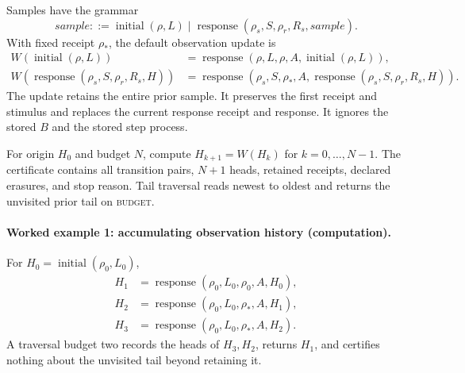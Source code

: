 Samples have the grammar
\[
 \textit{sample}::=\operatorname{initial}(\rho,L)
 \mid\operatorname{response}(\rho_s,S,\rho_r,R_s,\textit{sample}).
\]
With fixed receipt \(\rho_*\), the default observation update is
\[
\begin{aligned}
 W(\operatorname{initial}(\rho,L))
   &=\operatorname{response}(\rho,L,\rho,A,\operatorname{initial}(\rho,L)),\\
 W(\operatorname{response}(\rho_s,S,\rho_r,R_s,H))
   &=\operatorname{response}(\rho_s,S,\rho_*,A,
      \operatorname{response}(\rho_s,S,\rho_r,R_s,H)).
\end{aligned}
\]
The update retains the entire prior sample.  It preserves the first receipt and stimulus and replaces the current
response receipt and response.  It ignores the stored \(B\) and the stored step process.

For origin \(H_0\) and budget \(N\), compute \(H_{k+1}=W(H_k)\) for \(k=0,\ldots,N-1\).  The certificate contains all
transition pairs, \(N+1\) heads, retained receipts, declared erasures, and stop reason.  Tail traversal reads newest to
oldest and returns the unvisited prior tail on \textsc{budget}.

\paragraph{Worked example 1: accumulating observation history (computation).}
For \(H_0=\operatorname{initial}(\rho_0,L_0)\),
\[
\begin{aligned}
H_1&=\operatorname{response}(\rho_0,L_0,\rho_0,A,H_0),\\
H_2&=\operatorname{response}(\rho_0,L_0,\rho_*,A,H_1),\\
H_3&=\operatorname{response}(\rho_0,L_0,\rho_*,A,H_2).
\end{aligned}
\]
A traversal budget two records the heads of \(H_3,H_2\), returns \(H_1\), and certifies nothing about the unvisited
tail beyond retaining it.

